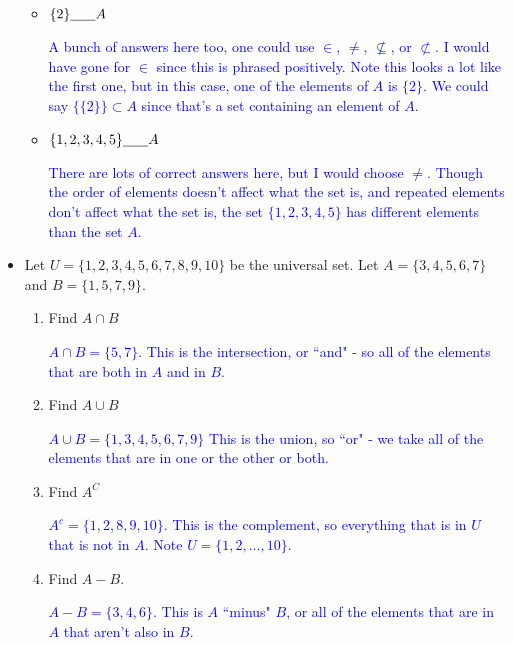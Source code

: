 \documentclass[10pt]{article}
\newcommand{\blue}{\textcolor{blue}}
\newcommand{\bs}{\begin{solution}}
\begin{document}
\begin{itemize}
\begin{itemize}
		\item $\{2\} \underline{\hspace{.25in}} A$ \bs \blue{A bunch of answers here too, one could use $\in$, $\neq$, $\not\subseteq$, or $\not\subset$. I would have gone for $\in$ since this is phrased positively. Note this looks a lot like the first one, but in this case, one of the elements of $A$ is $\{2\}$. We could say $\{\{2\}\}\subset A$ since that's a set containing an element of $A$.} \end{solution}
				\vspace{.5in}

		\item $\{1,2,3,4,5\} \underline{\hspace{.25in}}A$
		\bs \blue{There are lots of correct answers here, but I would choose $\neq$. Though the order of elements doesn't affect what the set is, and repeated elements don't affect what the set is, the set $\{1,2,3,4,5\}$ has different elements than the set $A$.}\end{solution}
				\vspace{.5in}

		\end{itemize}

\item[S2-1] Let $U = \{1,2,3,4,5,6,7,8,9,10\}$ be the universal set. Let $A = \{3,4,5,6,7\}$ and $B=\{1,5,7,9\}$.
		\begin{enumerate}
		\item Find $A\cap B$
		
		\bs \blue{ $A\cap B = \{ 5,7\}$. This is the intersection, or ``and" - so all of the elements that are both in $A$ and in $B$.  } \end{solution}
		\vspace{1in}
		\item Find $A \cup B$
		
		\bs \blue{ $A\cup B = \{1,3,4,5,6,7,9\}$ This is the union, so ``or" - we take all of the elements that are in one or the other or both.} \end{solution}
				\vspace{1in}

		\item Find $A^C$
		
		\bs \blue{ $A^c = \{ 1,2,8,9,10\}$. This is the complement, so everything that is in $U$ that is not in $A$. Note $U = \{1,2,\dots, 10\}$.} \end{solution}
				\vspace{1in}

		\item Find $A-B$.
		
		\bs \blue{ $A- B = \{ 3,4,6\}$. This is $A$ ``minus" $B$, or all of the elements that are in $A$ that aren't also in $B$.} \end{solution}

		\end{enumerate}

\end{itemize}	
\end{document}
